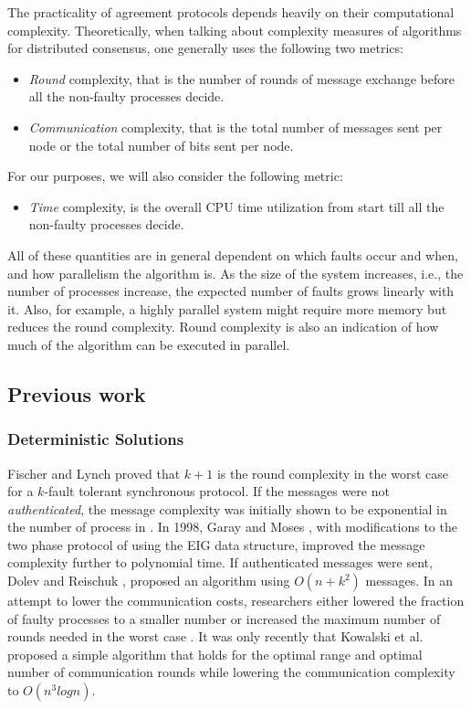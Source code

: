 The practicality of agreement protocols depends heavily on their computational complexity. Theoretically, when talking about complexity measures of algorithms for distributed consensus, one generally uses the following two metrics:
\begin{itemize}
\item \textit{Round} complexity, that is the number of rounds of message exchange before all the non-faulty processes decide.
\item \textit{Communication} complexity, that is the total number of messages sent per node or the total number of bits sent per node.
\end{itemize}
For our purposes, we will also consider the following metric: 
\begin{itemize}
\item \textit{Time} complexity, is the overall CPU time utilization from start till all the non-faulty processes decide.
\end{itemize}
All of these quantities are in general dependent on which faults occur and when, and how parallelism the algorithm is. As the size of the system increases, i.e., the number of processes increase, the expected number of faults grows linearly with it. Also, for example, a highly parallel system might require more memory but reduces the round complexity. Round complexity is also an indication of how much of the algorithm can be executed in parallel.

\subsection{Previous work}

\subsubsection{Deterministic Solutions}
Fischer and Lynch \cite{Fischer81alower} proved that $k + 1$ is the round complexity in the worst case for a $k$-fault tolerant synchronous protocol. If the messages were not \textit{authenticated}, the message complexity was initially shown to be exponential in the number of process in \cite{PeaseSL80}. In 1998, Garay and Moses \cite{GarayM98}, with modifications to the two phase protocol of \cite{BDDS87} using the EIG data structure, improved the message complexity further to polynomial time. If authenticated messages were sent, Dolev and Reischuk \cite{DolevR85}, proposed an algorithm using $O(n + k^2)$ messages. In an attempt to lower the communication costs, researchers either lowered the fraction of faulty processes to a smaller number \cite{DRS90} or increased the maximum number of rounds needed in the worst case \cite{TPS87}. It was only recently that Kowalski et al. \cite{KM13} proposed a simple algorithm that holds for the optimal range and optimal number of communication rounds while lowering the communication complexity to $O(n^{3}logn)$.

